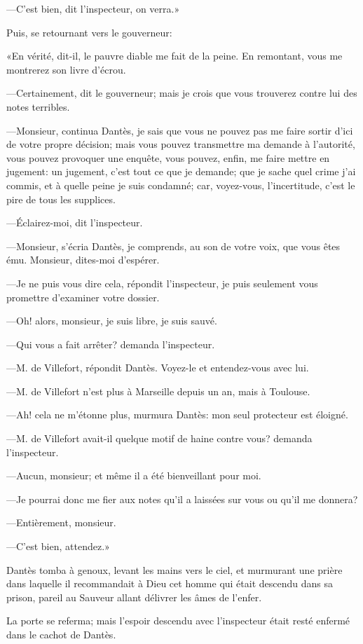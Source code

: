 —C'est bien, dit l'inspecteur, on verra.»

Puis, se retournant vers le gouverneur:

«En vérité, dit-il, le pauvre diable me fait de la peine. En remontant, vous me montrerez son livre d'écrou.

—Certainement, dit le gouverneur; mais je crois que vous trouverez contre lui des notes terribles.

—Monsieur, continua Dantès, je sais que vous ne pouvez pas me faire sortir d'ici de votre propre décision; mais vous pouvez transmettre ma demande à l'autorité, vous pouvez provoquer une enquête, vous pouvez, enfin, me faire mettre en jugement: un jugement, c'est tout ce que je demande; que je sache quel crime j'ai commis, et à quelle peine je suis condamné; car, voyez-vous, l'incertitude, c'est le pire de tous les supplices.

—Éclairez-moi, dit l'inspecteur.

—Monsieur, s'écria Dantès, je comprends, au son de votre voix, que vous êtes ému. Monsieur, dites-moi d'espérer.

—Je ne puis vous dire cela, répondit l'inspecteur, je puis seulement vous promettre d'examiner votre dossier.

—Oh! alors, monsieur, je suis libre, je suis sauvé.

—Qui vous a fait arrêter? demanda l'inspecteur.

—M. de Villefort, répondit Dantès. Voyez-le et entendez-vous avec lui.


—M. de Villefort n'est plus à Marseille depuis un an, mais à Toulouse.

—Ah! cela ne m'étonne plus, murmura Dantès: mon seul protecteur est éloigné.

—M. de Villefort avait-il quelque motif de haine contre vous? demanda l'inspecteur.

—Aucun, monsieur; et même il a été bienveillant pour moi.

—Je pourrai donc me fier aux notes qu'il a laissées sur vous ou qu'il me donnera?

—Entièrement, monsieur.

—C'est bien, attendez.»

Dantès tomba à genoux, levant les mains vers le ciel, et murmurant une prière dans laquelle il recommandait à Dieu cet homme qui était descendu dans sa prison, pareil au Sauveur allant délivrer les âmes de l'enfer.

La porte se referma; mais l'espoir descendu avec l'inspecteur était resté enfermé dans le cachot de Dantès.

